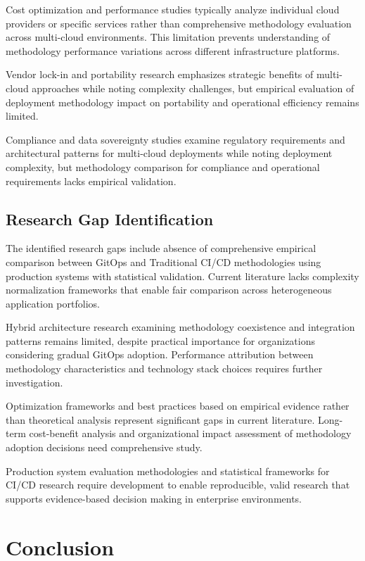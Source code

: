 Cost optimization and performance studies typically analyze individual cloud providers or specific services rather than comprehensive methodology evaluation across multi-cloud environments. This limitation prevents understanding of methodology performance variations across different infrastructure platforms.

Vendor lock-in and portability research emphasizes strategic benefits of multi-cloud approaches while noting complexity challenges, but empirical evaluation of deployment methodology impact on portability and operational efficiency remains limited.

Compliance and data sovereignty studies examine regulatory requirements and architectural patterns for multi-cloud deployments while noting deployment complexity, but methodology comparison for compliance and operational requirements lacks empirical validation.

\subsection{Research Gap Identification}

The identified research gaps include absence of comprehensive empirical comparison between GitOps and Traditional CI/CD methodologies using production systems with statistical validation. Current literature lacks complexity normalization frameworks that enable fair comparison across heterogeneous application portfolios.

Hybrid architecture research examining methodology coexistence and integration patterns remains limited, despite practical importance for organizations considering gradual GitOps adoption. Performance attribution between methodology characteristics and technology stack choices requires further investigation.

Optimization frameworks and best practices based on empirical evidence rather than theoretical analysis represent significant gaps in current literature. Long-term cost-benefit analysis and organizational impact assessment of methodology adoption decisions need comprehensive study.

Production system evaluation methodologies and statistical frameworks for CI/CD research require development to enable reproducible, valid research that supports evidence-based decision making in enterprise environments.

\section{Conclusion}


